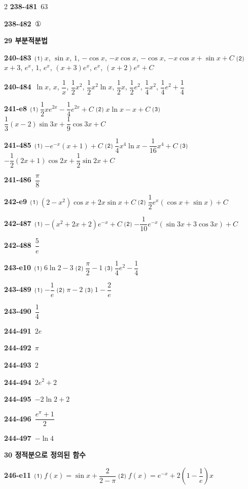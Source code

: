 \documentclass[10pt,a4paper]{article}
\begin{document}
\begin{multicols}{2}
\noindent\textbf{238-481}\ $63$\par
\noindent\textbf{238-482}\ ①\par
\noindent\textbf{29 부분적분법}\par\smallskip
\noindent\textbf{240-483}\ ⑴ $x$, $\sin x$, $1$, $-\cos x$, $-x\cos x$, $-\cos x$, $-x\cos x+\sin x+C$ ⑵ $x+3$, $e^x$, $1$, $e^x$, $(x+3)e^x$, $e^x$, $(x+2)e^x+C$\par
\noindent\textbf{240-484}\ $\ln x$, $x$, $\dfrac{1}{x}$, $\dfrac{1}{2}x^2$, $\dfrac{1}{2}x^2\ln x$, $\dfrac{1}{2}x$, $\dfrac{1}{2}e^2$, $\dfrac{1}{4}x^2$, $\dfrac{1}{4}e^2+\dfrac{1}{4}$\par
\noindent\textbf{241-e8}\ ⑴ $\dfrac{1}{2}xe^{2x}-\dfrac{1}{4}e^{2x}+C$ ⑵ $x\ln x-x+C$ ⑶ $\dfrac{1}{3}(x-2)\sin 3x+\dfrac{1}{9}\cos 3x+C$\par
\noindent\textbf{241-485}\ ⑴ $-e^{-x}(x+1)+C$ ⑵ $\dfrac{1}{4}x^4\ln x-\dfrac{1}{16}x^4+C$ ⑶ $-\dfrac{1}{2}(2x+1)\cos 2x+\dfrac{1}{2}\sin 2x+C$\par
\noindent\textbf{241-486}\ $\dfrac{\pi}{8}$\par
\noindent\textbf{242-e9}\ ⑴ $(2-x^2)\cos x+2x\sin x+C$ ⑵ $\dfrac{1}{2}e^x(\cos x+\sin x)+C$\par
\noindent\textbf{242-487}\ ⑴ $-(x^2+2x+2)e^{-x}+C$ ⑵ $-\dfrac{1}{10}e^{-x}(\sin 3x+3\cos 3x)+C$\par
\noindent\textbf{242-488}\ $\dfrac{5}{e}$\par
\noindent\textbf{243-e10}\ ⑴ $6\ln 2-3$ ⑵ $\dfrac{\pi}{2}-1$ ⑶ $\dfrac{1}{4}e^2-\dfrac{1}{4}$\par
\noindent\textbf{243-489}\ ⑴ $-\dfrac{1}{e}$ ⑵ $\pi-2$ ⑶ $1-\dfrac{2}{e}$\par
\noindent\textbf{243-490}\ $\dfrac{1}{4}$\par
\noindent\textbf{244-491}\ $2e$\par
\noindent\textbf{244-492}\ $\pi$\par
\noindent\textbf{244-493}\ $2$\par
\noindent\textbf{244-494}\ $2e^2+2$\par
\noindent\textbf{244-495}\ $-2\ln 2+2$\par
\noindent\textbf{244-496}\ $\dfrac{e^{\pi}+1}{2}$\par
\noindent\textbf{244-497}\ $-\ln 4$\par
\noindent\textbf{30 정적분으로 정의된 함수}\par\smallskip
\noindent\textbf{246-e11}\ ⑴ $f(x)=\sin x+\dfrac{2}{2-\pi}$ ⑵ $f(x)=e^{-x}+2\left(1-\dfrac{1}{e}\right)x$\par

\end{multicols}
\end{document}
